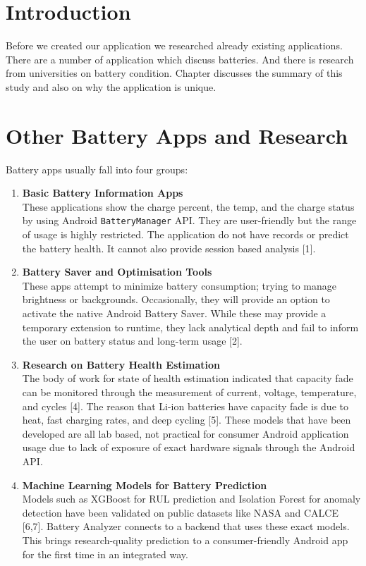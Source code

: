 \documentclass[12pt,a4paper]{report}
\begin{document}
\section{Introduction}
Before we created our application we researched already existing applications. There are a number of application which discuss batteries. And there is research from universities on battery condition. Chapter discusses the summary of this study and also on why the application is unique.

\section{Other Battery Apps and Research}
Battery apps usually fall into four groups:

\begin{enumerate}
    \item \textbf{Basic Battery Information Apps} \\
    These applications show the charge percent, the temp, and the charge status by using Android \texttt{BatteryManager} API. They are user-friendly but the range of usage is highly restricted. The application do not have records or predict the battery health. It cannot also provide session based analysis [1].
    
    \item \textbf{Battery Saver and Optimisation Tools} \\
    These apps attempt to minimize battery consumption; trying to manage brightness or backgrounds. Occasionally, they will provide an option to activate the native Android Battery Saver. While these may provide a temporary extension to runtime, they lack analytical depth and fail to inform the user on battery status and long-term usage [2].
    
    \item \textbf{Research on Battery Health Estimation} \\
    The body of work for state of health estimation indicated that capacity fade can be monitored through the measurement of current, voltage, temperature, and cycles [4]. The reason that Li-ion batteries have capacity fade is due to heat, fast charging rates, and deep cycling [5]. These models that have been developed are all lab based, not practical for consumer Android application usage due to lack of exposure of exact hardware signals through the Android API.
    
    \item \textbf{Machine Learning Models for Battery Prediction} \\
    Models such as XGBoost for RUL prediction and Isolation Forest for anomaly
    detection have been validated on public datasets like NASA and CALCE [6,7].
    Battery Analyzer connects to a backend that uses these exact models. This brings
    research-quality prediction to a consumer-friendly Android app for the first time
    in an integrated way.
\end{enumerate}
\end{document}
